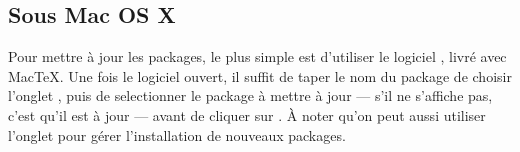 \subsection{Sous Mac OS X}

Pour mettre à jour les packages, le plus simple est d'utiliser le logiciel , livré avec MacTeX. Une fois le logiciel ouvert, il suffit de taper le nom du package de choisir l'onglet , puis de selectionner le package à mettre à jour --- s'il ne s'affiche pas, c'est qu'il est à jour --- avant de cliquer sur . À noter qu'on peut aussi utiliser l'onglet  pour gérer l'installation de nouveaux packages.